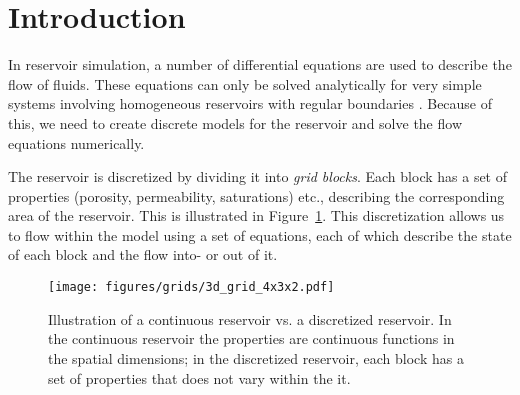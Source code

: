 
\section{Introduction} %
\label{sec:introduction}
In reservoir simulation, a number of differential equations are used to describe the flow of fluids. These equations can only be solved analytically for very simple systems involving homogeneous reservoirs with regular boundaries \cite{Peaceman1977Fundamentals}. Because of this, we need to create discrete models for the reservoir and solve the flow equations numerically.

The reservoir is discretized by dividing it into \emph{grid blocks}. Each block has a set of properties (porosity, permeability, saturations) etc., describing the corresponding area of the reservoir. This is illustrated in Figure~\ref{fig:grid-discretization}. This discretization allows us to flow within the model using a set of equations, each of which describe the state of each block and the flow into- or out of it.

\begin{figure}[htbp]
    \centering
    \texttt{[image: figures/grids/3d\_grid\_4x3x2.pdf]}
    \caption{Illustration of a continuous reservoir vs. a discretized reservoir. In the continuous reservoir the properties are continuous functions in the spatial dimensions; in the discretized reservoir, each block has a set of properties that does not vary within the it.}
    \label{fig:grid-discretization}
\end{figure}

